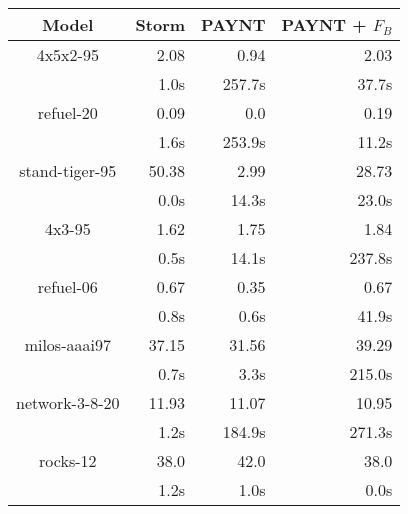 \begin{table}
\begin{tabular}{|c|r|r|r|}
\hline

Model & Storm & PAYNT & PAYNT + $F_{B}$ \\ \hline 

4x5x2-95 & 2.08 & 0.94 & 2.03 \\ 
 & 1.0s & 257.7s & 37.7s \\ 
\hline
refuel-20 & 0.09 & 0.0 & 0.19 \\ 
 & 1.6s & 253.9s & 11.2s \\ 
\hline
stand-tiger-95 & 50.38 & 2.99 & 28.73 \\ 
 & 0.0s & 14.3s & 23.0s \\ 
\hline
4x3-95 & 1.62 & 1.75 & 1.84 \\ 
 & 0.5s & 14.1s & 237.8s \\ 
\hline
refuel-06 & 0.67 & 0.35 & 0.67 \\ 
 & 0.8s & 0.6s & 41.9s \\ 
\hline
milos-aaai97 & 37.15 & 31.56 & 39.29 \\ 
 & 0.7s & 3.3s & 215.0s \\ 
\hline
network-3-8-20 & 11.93 & 11.07 & 10.95 \\ 
 & 1.2s & 184.9s & 271.3s \\ 
\hline
rocks-12 & 38.0 & 42.0 & 38.0 \\ 
 & 1.2s & 1.0s & 0.0s \\ 
\hline

\end{tabular}
\end{table}

